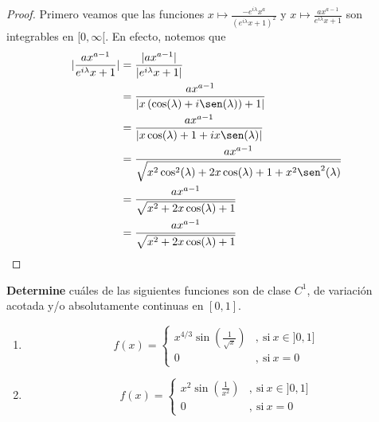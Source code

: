 \documentclass[12pt]{report}
\theoremstyle{largebreak}
\newcommand\abs[1]{\ensuremath{\lvert#1\rvert}}
\begin{document}
    \begin{proof}
		Primero veamos que las funciones $x\mapsto \frac{-e^{i\lambda}x^a}{(e^{i\lambda}x+1)^2}$ y $x\mapsto \frac{ax^{a-1}}{e^{i\lambda}x+1}$ son integrables en $[0,\infty[$. En efecto, notemos que
		\begin{equation*}
			\begin{split}
				\abs{\frac{ax^{a-1}}{e^{i\lambda}x+1}}&=\frac{\abs{ax^{a-1}}}{\abs{e^{i\lambda}x+1}}\\
				&=\frac{ax^{a-1}}{\abs{x\left(\cos(\lambda)+i\sen(\lambda)\right)+1}}\\
				&=\frac{ax^{a-1}}{\abs{x\cos(\lambda)+1+ix\sen(\lambda)}}\\
				&=\frac{ax^{a-1}}{\sqrt{x^2\cos^{2}(\lambda)+2x\cos(\lambda)+1+x^2\sen^{2}(\lambda)}}\\
				&=\frac{ax^{a-1}}{\sqrt{x^2+2x\cos(\lambda)+1}}\\
                &=\frac{ax^{a-1}}{\sqrt{x^2+2x\cos(\lambda)+1}}\\
			\end{split}
		\end{equation*}
		
    \end{proof}

    \begin{excer}
        \textbf{Determine} cuáles de las siguientes funciones son de clase $C^1$, de variación acotada y/o absolutamente continuas en $[0,1]$.
        \begin{enumerate}
            \item \begin{equation*}
                f(x) = 
                \left \{
                    \begin{aligned}
                    x^{4/3}\sin\left(\frac{1}{\sqrt{x}}\right) &,\ \text{si} \ x \in ]0,1]\\
                    0 &,\ \text{si} \ x=0
                    \end{aligned}
                \right .
            \end{equation*}
            \item \begin{equation*}
                f(x) = 
                \left \{
                    \begin{aligned}
                    x^2\sin\left(\frac{1}{x^2}\right) &,\ \text{si} \ x \in ]0,1]\\
                    0 &,\ \text{si} \ x=0
                    \end{aligned}
                \right .
            \end{equation*}
        \end{enumerate}
    \end{excer}
\end{document}
